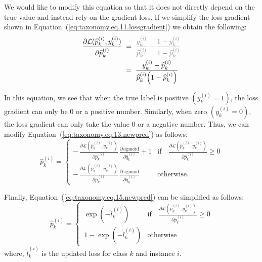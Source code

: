 \documentclass[review,1p,times,numbers]{elsarticle}
\begin{document}
We would like to modify this equation so that it does not directly depend on the true value and instead rely on the gradient loss. If we simplify the loss gradient shown in Equation~(\ref{eq:taxonomy.eq.11.lossgradient}) we obtain the following:
\begin{align}
    \label{eq:taxonomy.eq.14.newlossgradient}
    \frac{\partial \mathcal{L}(\widehat{p}_k^{(i)}, y_k^{(i)})}{\partial \widehat{p}_k^{(i)}}
    & \; = \; \textcolor{gray}{\frac{y_k^{(i)}}{\widehat{p}_k^{(i)}} - \frac{1 - y_k^{(i)}}{1 - \widehat{p}_k^{(i)}} }
    \\
    & \; = \; \frac{y_k^{(i)} - \widehat{p}_k^{(i)}}{\widehat{p}_k^{(i)}{\left(1 - \widehat{p}_k^{(i)}\right)}}
\end{align}

In this equation, we see that when the true label is positive $\left(y_k^{(i)}=1\right) $, the loss gradient can only be 0 or a positive number. Similarly, when zero $\left(y_k^{(i)}=0\right) $, the loss gradient can only take the value 0 or a negative number. Thus, we can modify Equation~(\ref{eq:taxonomy.eq.13.newpred})  as follows:
\begin{equation}
    \label{eq:taxonomy.eq.15.newpred}
    \widehat{p}_k^{(i)} =
    \begin{cases}
        -\, \frac{\partial \mathcal{L}(\widehat{p}_k^{(i)}, y_k^{(i)})}{\partial {\widehat p}_k^{(i)}} \, \frac{\partial{\text{sigmoid}}}{\partial{\widehat{q}_k^{(i)}}} + 1
        &
        \text{if} \quad \frac{\partial \mathcal{L}(\widehat{p}_k^{(i)}, y_k^{(i)})}{\partial {\widehat p}_k^{(i)}} \geq 0
        \\
        -\, \frac{\partial \mathcal{L}(\widehat{p}_k^{(i)}, y_k^{(i)})}{\partial {\widehat p}_k^{(i)}} \, \frac{\partial{\text{sigmoid}}}{\partial{\widehat{q}_k^{(i)}}}
        &
        \text{otherwise.}
    \end{cases}
\end{equation}

Finally, Equation~(\ref{eq:taxonomy.eq.15.newpred}) can be simplified as follows:
\begin{equation}
    \label{eq:taxonomy.eq.16.newpred}
    \widehat{p}_k^{(i)} =
    \begin{cases}
        \, \exp(-\widehat{l}_k^{(i)})
        &
        \text{if} \quad \frac{\partial \mathcal{L}(\widehat{p}_k^{(i)}, y_k^{(i)})}{\partial {\widehat p}_k^{(i)}} \geq 0
        \\
        \, 1 - \exp(-\widehat{l}_k^{(i)})
        &
        \text{otherwise}
    \end{cases}
\end{equation}
where, ${\widehat l}_k^{(i)} $ is the updated loss for class $k $ and instance $i $.
\end{document}
